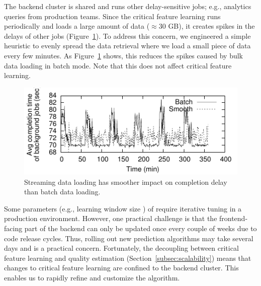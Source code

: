 
The backend cluster is shared 
and runs other delay-sensitive 
jobs; e.g.,  analytics queries from production teams. 
 Since the critical feature learning runs periodically 
and loads a large amount of data ($\approx$30 
GB), it creates spikes in the delays of other jobs 
(Figure~\ref{fig:completion-delay}).  
To address this concern, we engineered a simple 
heuristic to evenly spread the data retrieval where  
we load a small piece of data every few minutes. 
As Figure~\ref{fig:completion-delay} shows, this 
reduces the spikes caused by bulk data loading in 
batch mode.
Note that this does not affect critical feature learning.


\begin{figure}[t!]
\centering
\includegraphics[width=.8\textwidth]{figures/cfa-smooth-batch-timeseries.pdf}
\caption{Streaming data loading has smoother 
impact on completion delay than batch data loading.}
\label{fig:completion-delay}
\end{figure}

Some parameters (e.g., learning window size 
\HTimeWindowLearn) of \dda require iterative tuning in a 
production environment.
However, one practical challenge is that the 
frontend-facing part of the backend can 
only  be updated once every couple of weeks 
due to code release cycles. 
Thus,  rolling out new prediction algorithms may 
take several days and is a practical concern.
Fortunately, the decoupling between critical feature 
learning and quality estimation 
(Section~\ref{subsec:scalability})
means that changes to critical feature learning
are confined to the backend cluster. 
This enables us to rapidly refine 
and customize the \dda algorithm. 


